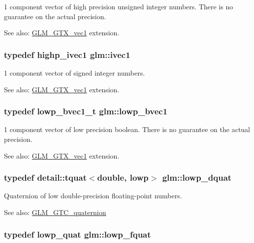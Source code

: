 1 component vector of high precision unsigned integer numbers. There is no guarantee on the actual precision. \begin{Desc}
\item[See also:]\hyperlink{group__gtx__vec1}{GLM\_\-GTX\_\-vec1} extension. \end{Desc}
\hypertarget{namespaceglm_946031cea0c22745848ebd873e6facb0}{
\subsubsection[ivec1]{\setlength{\rightskip}{0pt plus 5cm}typedef {\bf highp\_\-ivec1} {\bf glm::ivec1}}}
\label{namespaceglm_946031cea0c22745848ebd873e6facb0}


1 component vector of signed integer numbers. \begin{Desc}
\item[See also:]\hyperlink{group__gtx__vec1}{GLM\_\-GTX\_\-vec1} extension. \end{Desc}
\hypertarget{namespaceglm_f22d6a46a35bcda63801fe78c033f35f}{
\subsubsection[lowp\_\-bvec1]{\setlength{\rightskip}{0pt plus 5cm}typedef lowp\_\-bvec1\_\-t {\bf glm::lowp\_\-bvec1}}}
\label{namespaceglm_f22d6a46a35bcda63801fe78c033f35f}


1 component vector of low precision boolean. There is no guarantee on the actual precision. \begin{Desc}
\item[See also:]\hyperlink{group__gtx__vec1}{GLM\_\-GTX\_\-vec1} extension. \end{Desc}
\hypertarget{namespaceglm_d5f207f07b36f4ebd98338c21b92062e}{
\subsubsection[lowp\_\-dquat]{\setlength{\rightskip}{0pt plus 5cm}typedef detail::tquat$<$double, lowp$>$ {\bf glm::lowp\_\-dquat}}}
\label{namespaceglm_d5f207f07b36f4ebd98338c21b92062e}


Quaternion of low double-precision floating-point numbers.

\begin{Desc}
\item[See also:]\hyperlink{group__gtc__quaternion}{GLM\_\-GTC\_\-quaternion} \end{Desc}
\hypertarget{namespaceglm_ad1f5b3c348c223fb36e28f646552cff}{
\subsubsection[lowp\_\-fquat]{\setlength{\rightskip}{0pt plus 5cm}typedef {\bf lowp\_\-quat} {\bf glm::lowp\_\-fquat}}}
\label{namespaceglm_ad1f5b3c348c223fb36e28f646552cff}


